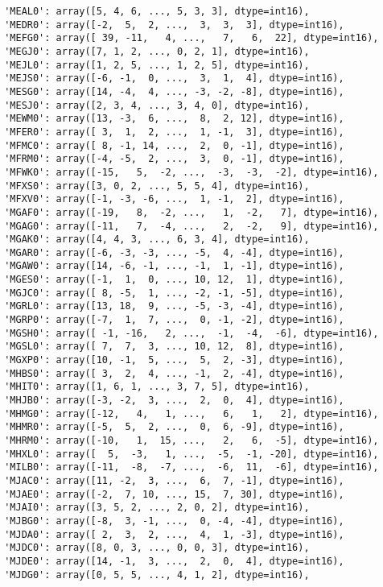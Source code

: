 \documentclass[11pt]{article}
\begin{document}
\begin{verbatim}
 'MEAL0': array([5, 4, 6, ..., 5, 3, 3], dtype=int16),
 'MEDR0': array([-2,  5,  2, ...,  3,  3,  3], dtype=int16),
 'MEFG0': array([ 39, -11,   4, ...,   7,   6,  22], dtype=int16),
 'MEGJ0': array([7, 1, 2, ..., 0, 2, 1], dtype=int16),
 'MEJL0': array([1, 2, 5, ..., 1, 2, 5], dtype=int16),
 'MEJS0': array([-6, -1,  0, ...,  3,  1,  4], dtype=int16),
 'MESG0': array([14, -4,  4, ..., -3, -2, -8], dtype=int16),
 'MESJ0': array([2, 3, 4, ..., 3, 4, 0], dtype=int16),
 'MEWM0': array([13, -3,  6, ...,  8,  2, 12], dtype=int16),
 'MFER0': array([ 3,  1,  2, ...,  1, -1,  3], dtype=int16),
 'MFMC0': array([ 8, -1, 14, ...,  2,  0, -1], dtype=int16),
 'MFRM0': array([-4, -5,  2, ...,  3,  0, -1], dtype=int16),
 'MFWK0': array([-15,   5,  -2, ...,  -3,  -3,  -2], dtype=int16),
 'MFXS0': array([3, 0, 2, ..., 5, 5, 4], dtype=int16),
 'MFXV0': array([-1, -3, -6, ...,  1, -1,  2], dtype=int16),
 'MGAF0': array([-19,   8,  -2, ...,   1,  -2,   7], dtype=int16),
 'MGAG0': array([-11,   7,  -4, ...,   2,  -2,   9], dtype=int16),
 'MGAK0': array([4, 4, 3, ..., 6, 3, 4], dtype=int16),
 'MGAR0': array([-6, -3, -3, ..., -5,  4, -4], dtype=int16),
 'MGAW0': array([14, -6, -1, ..., -1,  1, -1], dtype=int16),
 'MGES0': array([-1,  1,  0, ..., 10, 12,  1], dtype=int16),
 'MGJC0': array([ 8, -5,  1, ..., -2, -1, -5], dtype=int16),
 'MGRL0': array([13, 18,  9, ..., -5, -3, -4], dtype=int16),
 'MGRP0': array([-7,  1,  7, ...,  0, -1, -2], dtype=int16),
 'MGSH0': array([ -1, -16,   2, ...,  -1,  -4,  -6], dtype=int16),
 'MGSL0': array([ 7,  7,  3, ..., 10, 12,  8], dtype=int16),
 'MGXP0': array([10, -1,  5, ...,  5,  2, -3], dtype=int16),
 'MHBS0': array([ 3,  2,  4, ..., -1,  2, -4], dtype=int16),
 'MHIT0': array([1, 6, 1, ..., 3, 7, 5], dtype=int16),
 'MHJB0': array([-3, -2,  3, ...,  2,  0,  4], dtype=int16),
 'MHMG0': array([-12,   4,   1, ...,   6,   1,   2], dtype=int16),
 'MHMR0': array([-5,  5,  2, ...,  0,  6, -9], dtype=int16),
 'MHRM0': array([-10,   1,  15, ...,   2,   6,  -5], dtype=int16),
 'MHXL0': array([  5,  -3,   1, ...,  -5,  -1, -20], dtype=int16),
 'MILB0': array([-11,  -8,  -7, ...,  -6,  11,  -6], dtype=int16),
 'MJAC0': array([11, -2,  3, ...,  6,  7, -1], dtype=int16),
 'MJAE0': array([-2,  7, 10, ..., 15,  7, 30], dtype=int16),
 'MJAI0': array([3, 5, 2, ..., 2, 0, 2], dtype=int16),
 'MJBG0': array([-8,  3, -1, ...,  0, -4, -4], dtype=int16),
 'MJDA0': array([ 2,  3,  2, ...,  4,  1, -3], dtype=int16),
 'MJDC0': array([8, 0, 3, ..., 0, 0, 3], dtype=int16),
 'MJDE0': array([14, -1,  3, ...,  2,  0,  4], dtype=int16),
 'MJDG0': array([0, 5, 5, ..., 4, 1, 2], dtype=int16),

\end{verbatim}
\end{document}
